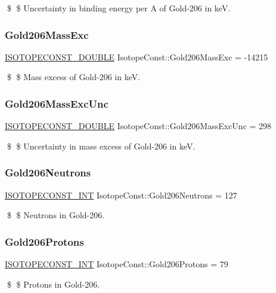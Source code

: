 \$ \$ Uncertainty in binding energy per A of Gold-\/206 in keV. \mbox{\label{group___isotope_const-_gold-_au206_ga623f564958b9354f843490c49617bfc9}} 
\subsubsection{\texorpdfstring{Gold206\+Mass\+Exc}{Gold206MassExc}}
{\footnotesize\ttfamily \mbox{\hyperlink{group___isotope_const-_macros_ga8f45a7272ce02c0b4c65c44636ed719a}{I\+S\+O\+T\+O\+P\+E\+C\+O\+N\+S\+T\+\_\+\+D\+O\+U\+B\+LE}} Isotope\+Const\+::\+Gold206\+Mass\+Exc = -\/14215}

\$ \$ Mass excess of Gold-\/206 in keV. \mbox{\label{group___isotope_const-_gold-_au206_gaf1977bc071d44d64c8d7f897307bb684}} 
\subsubsection{\texorpdfstring{Gold206\+Mass\+Exc\+Unc}{Gold206MassExcUnc}}
{\footnotesize\ttfamily \mbox{\hyperlink{group___isotope_const-_macros_ga8f45a7272ce02c0b4c65c44636ed719a}{I\+S\+O\+T\+O\+P\+E\+C\+O\+N\+S\+T\+\_\+\+D\+O\+U\+B\+LE}} Isotope\+Const\+::\+Gold206\+Mass\+Exc\+Unc = 298}

\$ \$ Uncertainty in mass excess of Gold-\/206 in keV. \mbox{\label{group___isotope_const-_gold-_au206_gaff7f958833bca7bd1ca14e9f0459f863}} 
\subsubsection{\texorpdfstring{Gold206\+Neutrons}{Gold206Neutrons}}
{\footnotesize\ttfamily \mbox{\hyperlink{group___isotope_const-_macros_ga5f18360b3e99483a35c32d789e62621c}{I\+S\+O\+T\+O\+P\+E\+C\+O\+N\+S\+T\+\_\+\+I\+NT}} Isotope\+Const\+::\+Gold206\+Neutrons = 127}

\$ \$ Neutrons in Gold-\/206. \mbox{\label{group___isotope_const-_gold-_au206_ga019b978c56895a4e5b6892564283566d}} 
\subsubsection{\texorpdfstring{Gold206\+Protons}{Gold206Protons}}
{\footnotesize\ttfamily \mbox{\hyperlink{group___isotope_const-_macros_ga5f18360b3e99483a35c32d789e62621c}{I\+S\+O\+T\+O\+P\+E\+C\+O\+N\+S\+T\+\_\+\+I\+NT}} Isotope\+Const\+::\+Gold206\+Protons = 79}

\$ \$ Protons in Gold-\/206. 